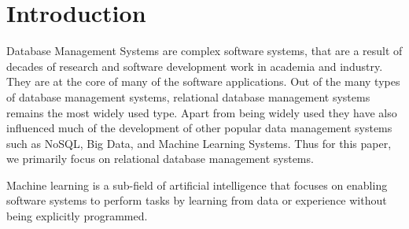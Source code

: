 \section{Introduction}

Database Management Systems are complex software systems, that are a result of decades of research and software development work in academia and industry.
They are at the core of many of the software applications.
Out of the many types of database management systems, relational database management systems remains the most widely used type.
Apart from being widely used they have also influenced much of the development of other popular data management systems such as NoSQL, Big Data, and Machine Learning Systems.
Thus for this paper, we primarily focus on relational database management systems.

Machine learning is a sub-field of artificial intelligence that focuses on enabling software systems to perform tasks by learning from data or experience without being explicitly programmed.
